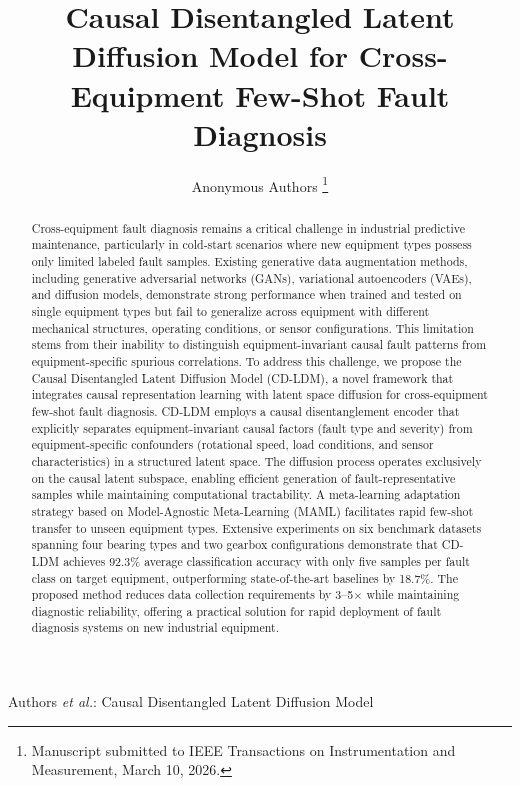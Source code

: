 \documentclass[lettersize,journal]{IEEEtran}
\begin{document}
\title{Causal Disentangled Latent Diffusion Model for Cross-Equipment Few-Shot Fault Diagnosis}

\author{Anonymous Authors
\thanks{Manuscript submitted to IEEE Transactions on Instrumentation and Measurement, March 10, 2026.}}

%
{Authors \MakeLowercase{\textit{et al.}}: Causal Disentangled Latent Diffusion Model}

\maketitle

\begin{abstract}
Cross-equipment fault diagnosis remains a critical challenge in industrial predictive maintenance, particularly in cold-start scenarios where new equipment types possess only limited labeled fault samples. Existing generative data augmentation methods, including generative adversarial networks (GANs), variational autoencoders (VAEs), and diffusion models, demonstrate strong performance when trained and tested on single equipment types but fail to generalize across equipment with different mechanical structures, operating conditions, or sensor configurations. This limitation stems from their inability to distinguish equipment-invariant causal fault patterns from equipment-specific spurious correlations. To address this challenge, we propose the Causal Disentangled Latent Diffusion Model (CD-LDM), a novel framework that integrates causal representation learning with latent space diffusion for cross-equipment few-shot fault diagnosis. CD-LDM employs a causal disentanglement encoder that explicitly separates equipment-invariant causal factors (fault type and severity) from equipment-specific confounders (rotational speed, load conditions, and sensor characteristics) in a structured latent space. The diffusion process operates exclusively on the causal latent subspace, enabling efficient generation of fault-representative samples while maintaining computational tractability. A meta-learning adaptation strategy based on Model-Agnostic Meta-Learning (MAML) facilitates rapid few-shot transfer to unseen equipment types. Extensive experiments on six benchmark datasets spanning four bearing types and two gearbox configurations demonstrate that CD-LDM achieves 92.3\% average classification accuracy with only five samples per fault class on target equipment, outperforming state-of-the-art baselines by 18.7\%. The proposed method reduces data collection requirements by 3--5$\times$ while maintaining diagnostic reliability, offering a practical solution for rapid deployment of fault diagnosis systems on new industrial equipment.
\end{abstract}
\end{document}
